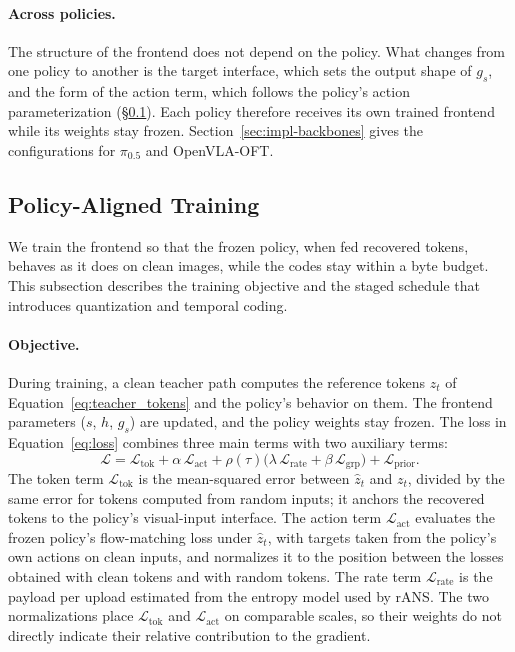 \paragraph{Across policies.}
The structure of the frontend does not depend on the policy. What changes
from one policy to another is the target interface, which sets the output
shape of $g_s$, and the form of the action term, which follows the
policy's action parameterization (\S\ref{sec:design-objective}). Each
policy therefore receives its own trained frontend while its weights stay
frozen. Section~\ref{sec:impl-backbones} gives the configurations for
$\pi_{0.5}$ and OpenVLA-OFT.

\subsection{Policy-Aligned Training}
\label{sec:design-objective}
We train the frontend so that the frozen policy, when fed recovered
tokens, behaves as it does on clean images, while the codes stay within
a byte budget. This subsection describes the training objective and the
staged schedule that introduces quantization and temporal coding.

\paragraph{Objective.}
During training, a clean teacher path computes the reference tokens
$z_t$ of Equation~\ref{eq:teacher_tokens} and the policy's behavior on
them. The frontend parameters ($s$, $h$, $g_s$) are updated, and the
policy weights stay frozen. The loss in Equation~\ref{eq:loss} combines three main terms with two
auxiliary terms:
\begin{equation}
  \mathcal{L} = \mathcal{L}_{\mathrm{tok}} + \alpha\,\mathcal{L}_{\mathrm{act}}
  + \rho(\tau)\big(\lambda\,\mathcal{L}_{\mathrm{rate}}
  + \beta\,\mathcal{L}_{\mathrm{grp}}\big) + \mathcal{L}_{\mathrm{prior}} .
  \label{eq:loss}
\end{equation}
The token term $\mathcal{L}_{\mathrm{tok}}$ is the mean-squared error
between $\hat{z}_t$ and $z_t$, divided by the same error for tokens
computed from random inputs; it anchors the recovered tokens to the
policy's visual-input interface. The action term
$\mathcal{L}_{\mathrm{act}}$ evaluates the frozen policy's
flow-matching loss under $\hat{z}_t$, with targets taken from the
policy's own actions on clean inputs, and normalizes it to the position
between the losses obtained with clean tokens and with random tokens.
The rate term $\mathcal{L}_{\mathrm{rate}}$ is the payload per upload
estimated from the entropy model used by rANS. The two normalizations
place $\mathcal{L}_{\mathrm{tok}}$ and $\mathcal{L}_{\mathrm{act}}$ on
comparable scales, so their weights do not directly indicate their
relative contribution to the gradient.

